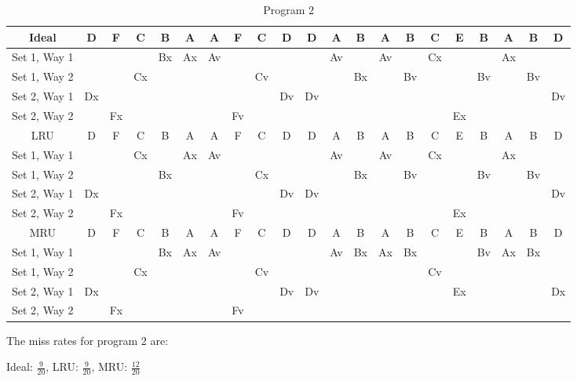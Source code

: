 \documentclass[a4paper, 11pt]{exam}
\begin{document}
\begin{enumerate}
\begin{table}[H]
\caption{Program 2}
\begin{center}
\tiny
\begin{tabular}{|c|c|c|c|c|c|c|c|c|c|c|c|c|c|c|c|c|c|c|c|c|}
\hline
Ideal & D & F & C & B & A & A & F & C & D & D & A & B & A & B & C & E & B & A & B & D \\
\hline
Set 1, Way 1 &  &  &  & Bx & Ax & Av &  &  &  &  & Av &  & Av &  & Cx &  &  & Ax & &\\
Set 1, Way 2 &  &  & Cx &  &  &  &  & Cv &  &  &  & Bx &  & Bv &  &  & Bv &  & Bv  &\\
\hline
Set 2, Way 1 & Dx &  &  &  &  &  &  &  & Dv & Dv &  &  &  &  &  &  &  &  &  & Dv \\
Set 2, Way 2 &  & Fx &  &  &  &  & Fv &  &  &  &  &  &  &  &  & Ex & & & &\\
\hline
\hline
LRU & D & F & C & B & A & A & F & C & D & D & A & B & A & B & C & E & B & A & B & D \\
\hline
Set 1, Way 1 &  &  & Cx &  & Ax & Av &  &  &  &  & Av &  & Av &  & Cx &  &  & Ax  &  &\\
Set 1, Way 2 &  &  &  & Bx &  &  &  & Cx &  &  &  & Bx &  & Bv &  &  & Bv &  & Bv&\\
\hline
Set 2, Way 1 & Dx &  &  &  &  &  &  &  & Dv & Dv &  &  &  &  &  &  &  &  &  & Dv \\
Set 2, Way 2 &  & Fx &  &  &  &  & Fv &&&&&&&&&Ex&&&&\\
\hline
\hline
MRU & D & F & C & B & A & A & F & C & D & D & A & B & A & B & C & E & B & A & B & D \\
\hline
Set 1, Way 1 &  &  &  & Bx & Ax & Av &  &  &  &  & Av & Bx & Ax & Bx &  &  & Bv & Ax & Bx& \\
Set 1, Way 2 &  &  & Cx &  &  &  &  & Cv &  &  &  &  &  &  & Cv &&&&& \\
\hline
Set 2, Way 1 & Dx &  &  &  &  &  &  &  & Dv & Dv &  &  &  &  &  & Ex &  &  &  & Dx \\
Set 2, Way 2 &  & Fx &  &  &  &  & Fv &&&&&&&&&&&&&\\
\hline
\end{tabular}
\end{center}
\label{default}
\end{table}%
The miss rates for program 2 are:

Ideal: $\frac{9}{20}$, LRU: $\frac{9}{20}$, MRU: $\frac{12}{20}$


\end{enumerate}
\end{document}
